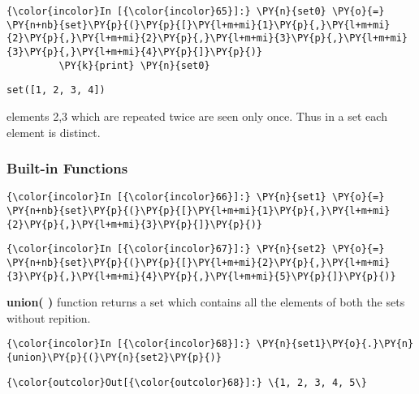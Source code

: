     \begin{Verbatim}[commandchars=\\\{\}]
{\color{incolor}In [{\color{incolor}65}]:} \PY{n}{set0} \PY{o}{=} \PY{n+nb}{set}\PY{p}{(}\PY{p}{[}\PY{l+m+mi}{1}\PY{p}{,}\PY{l+m+mi}{2}\PY{p}{,}\PY{l+m+mi}{2}\PY{p}{,}\PY{l+m+mi}{3}\PY{p}{,}\PY{l+m+mi}{3}\PY{p}{,}\PY{l+m+mi}{4}\PY{p}{]}\PY{p}{)}
         \PY{k}{print} \PY{n}{set0}
\end{Verbatim}

    \begin{Verbatim}[commandchars=\\\{\}]
set([1, 2, 3, 4])
    \end{Verbatim}

    elements 2,3 which are repeated twice are seen only once. Thus in a set
each element is distinct.

    \subsubsection{Built-in Functions}\label{built-in-functions}

    \begin{Verbatim}[commandchars=\\\{\}]
{\color{incolor}In [{\color{incolor}66}]:} \PY{n}{set1} \PY{o}{=} \PY{n+nb}{set}\PY{p}{(}\PY{p}{[}\PY{l+m+mi}{1}\PY{p}{,}\PY{l+m+mi}{2}\PY{p}{,}\PY{l+m+mi}{3}\PY{p}{]}\PY{p}{)}
\end{Verbatim}

    \begin{Verbatim}[commandchars=\\\{\}]
{\color{incolor}In [{\color{incolor}67}]:} \PY{n}{set2} \PY{o}{=} \PY{n+nb}{set}\PY{p}{(}\PY{p}{[}\PY{l+m+mi}{2}\PY{p}{,}\PY{l+m+mi}{3}\PY{p}{,}\PY{l+m+mi}{4}\PY{p}{,}\PY{l+m+mi}{5}\PY{p}{]}\PY{p}{)}
\end{Verbatim}

    \textbf{union( )} function returns a set which contains all the elements
of both the sets without repition.

    \begin{Verbatim}[commandchars=\\\{\}]
{\color{incolor}In [{\color{incolor}68}]:} \PY{n}{set1}\PY{o}{.}\PY{n}{union}\PY{p}{(}\PY{n}{set2}\PY{p}{)}
\end{Verbatim}

            \begin{Verbatim}[commandchars=\\\{\}]
{\color{outcolor}Out[{\color{outcolor}68}]:} \{1, 2, 3, 4, 5\}
\end{Verbatim}
        
